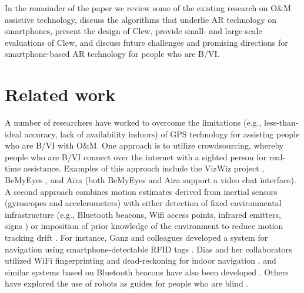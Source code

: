 \documentclass[chi]{sigchi}
\newcommand{\BVI}{B/VI\xspace}
\newcommand{\OM}{O\&M\xspace}
\begin{document}
In the remainder of the paper we review some of the existing research on \OM assistive technology, discuss the algorithms that underlie AR technology on smartphones, present the design of Clew, provide small- and large-scale evaluations of Clew, and discuss future challenges and promising directions for smartphone-based AR technology for people who are \BVI.

\section{Related work}


A number of researchers have worked to overcome the limitations (e.g., less-than-ideal accuracy, lack of availability indoors) of GPS technology for assisting people who are \BVI with \OM.  One approach is to utilize crowdsourcing, whereby people who are \BVI connect over the internet with a sighted person for real-time assistance.  Examples of this approach include the VizWiz project \cite{bigham2010vizwiz}, BeMyEyes \cite{bemyeyesaccessworld}, and Aira \cite{aira} (both BeMyEyes and Aira support a video chat interface).  A second approach combines motion estimates derived from inertial sensors (gyroscopes and accelerometers) with either detection of fixed environmental infrastructure (e.g., Bluetooth beacons, Wifi access points, infrared emitters, signs \cite{legge2013indoor}) or imposition of prior knowledge of the environment to reduce motion tracking drift \cite{riehle2013indoor}.  For instance, Ganz and colleagues developed a system for navigation using smartphone-detectable RFID tags \cite{ganz2015percept, ganz2011percept, ganz2014percept}.  Dias and her collaborators utilized WiFi fingerprinting and dead-reckoning for indoor navigation \cite{Dias__2014_7778}, and similar systems based on Bluetooth beacons have also been developed \cite{ishihara2017beacon, ahmetovic2016navcog}.  Others have explored the use of robots as guides for people who are blind \cite{Nanavati:2018:CIN:3173386.3176976}.%
\end{document}
